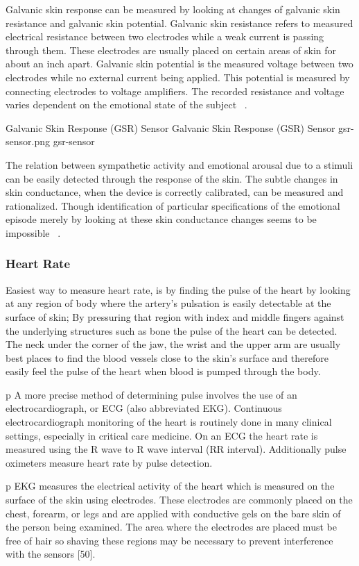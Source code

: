 \documentclass{uofsthesis-cs}
\begin{document}
Galvanic skin response can be measured by looking at changes of galvanic skin resistance and galvanic skin potential. Galvanic skin resistance refers to measured electrical resistance between two electrodes while a weak current is passing through them. These electrodes are usually placed on certain areas of skin for about an inch apart. Galvanic skin potential is the measured voltage between two electrodes while no external current being applied. This potential is measured by connecting electrodes to voltage amplifiers. The recorded resistance and voltage varies dependent on the emotional state of the subject ~\cite{pflanzer2013galvanic}.

\img
{Galvanic Skin Response (GSR) Sensor}
{Galvanic Skin Response (GSR) Sensor}
{gsr-sensor.png}
{gsr-sensor}

The relation between sympathetic activity and emotional arousal due to a stimuli can be easily detected through the response of the skin. The subtle changes in skin conductance, when the device is correctly calibrated, can be measured and rationalized. Though identification of particular specifications of the emotional episode merely by looking at these skin conductance changes seems to be impossible ~\cite{pflanzer2013galvanic}.

\subsubsection{Heart Rate}
Easiest way to measure heart rate, is by finding the pulse of the heart by looking at any region of body where the artery's pulsation is easily detectable at the surface of skin; By pressuring that region with index and middle fingers against the underlying structures such as bone the pulse of the heart can be detected. The neck under the corner of the jaw, the wrist and the upper arm are usually best places to find the blood vessels close to the skin's surface and therefore easily feel the pulse of the heart when blood is pumped through the body.

p A more precise method of determining pulse involves the use of an electrocardiograph, or ECG (also abbreviated EKG). Continuous electrocardiograph monitoring of the heart is routinely done in many clinical settings, especially in critical care medicine. On an ECG the heart rate is measured using the R wave to R wave interval (RR interval). Additionally pulse oximeters measure heart rate by pulse detection.

p EKG measures the electrical activity of the heart which is measured on the surface of the skin using electrodes. These electrodes are commonly placed on the chest, forearm, or legs and are applied with conductive gels on the bare skin of the person being examined. The area where the electrodes are placed must be free of hair so shaving these regions may be necessary to prevent interference with the sensors [50].
\end{document}
